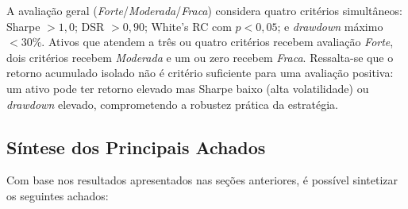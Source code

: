 \documentclass[a4paper,10pt]{article}
\begin{document}
\noindent A avaliação geral (\textit{Forte}/\textit{Moderada}/\textit{Fraca}) considera quatro critérios simultâneos: Sharpe $> 1{,}0$; DSR $> 0{,}90$; White's RC com $p < 0{,}05$; e \textit{drawdown} máximo $< 30\%$. Ativos que atendem a três ou quatro critérios recebem avaliação \textit{Forte}, dois critérios recebem \textit{Moderada} e um ou zero recebem \textit{Fraca}. Ressalta-se que o retorno acumulado isolado não é critério suficiente para uma avaliação positiva: um ativo pode ter retorno elevado mas Sharpe baixo (alta volatilidade) ou \textit{drawdown} elevado, comprometendo a robustez prática da estratégia.

\subsection{Síntese dos Principais Achados}

Com base nos resultados apresentados nas seções anteriores, é possível sintetizar os seguintes achados:
\end{document}
